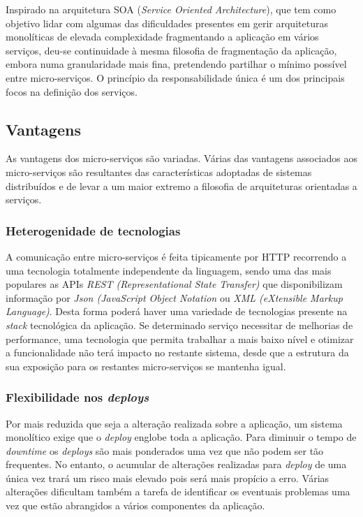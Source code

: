     Inspirado na arquitetura SOA (\textit{Service Oriented Architecture}), que tem como objetivo lidar com algumas das dificuldades presentes em gerir arquiteturas monolíticas de elevada complexidade fragmentando a aplicação em vários serviços, deu-se continuidade à mesma filosofia de fragmentação da aplicação, embora numa granularidade mais fina, pretendendo partilhar o mínimo possível entre micro-serviços. O princípio da responsabilidade única é um dos principais focos na definição dos serviços.
    
    
    \subsection{Vantagens}
    
        As vantagens dos micro-serviços são variadas. Várias das vantagens associados aos micro-serviços são resultantes das características adoptadas de sistemas distribuídos e de levar a um maior extremo a filosofia de arquiteturas orientadas a serviços. 
    
    \subsubsection*{Heterogenidade de tecnologias}
    
        A comunicação entre micro-serviços é feita tipicamente por HTTP recorrendo a uma tecnologia totalmente independente da linguagem, sendo uma das mais populares as APIs \textit{REST (Representational State Transfer)} que disponibilizam informação por \textit{Json (JavaScript Object Notation} ou \textit{XML (eXtensible Markup Language)}. Desta forma poderá haver uma variedade de tecnologias presente na \textit{stack} tecnológica da aplicação. Se determinado serviço necessitar de melhorias de performance, uma tecnologia que permita trabalhar a mais baixo nível e otimizar a funcionalidade não terá impacto no restante sistema, desde que a estrutura da sua exposição para os restantes micro-serviços se mantenha igual. 
    
    \subsubsection*{Flexibilidade nos \textit{deploys}}
    
        Por mais reduzida que seja a alteração realizada sobre a aplicação, um sistema monolítico exige que o \textit{deploy} englobe toda a aplicação. Para diminuir o tempo de \textit{downtime} os \textit{deploys} são mais ponderados uma vez que não podem ser tão frequentes. No entanto, o acumular de alterações realizadas para \textit{deploy} de uma única vez trará um risco mais elevado pois será mais propício a erro. Várias alterações dificultam também a tarefa de identificar os eventuais problemas uma vez que estão abrangidos a vários componentes da aplicação.
    

